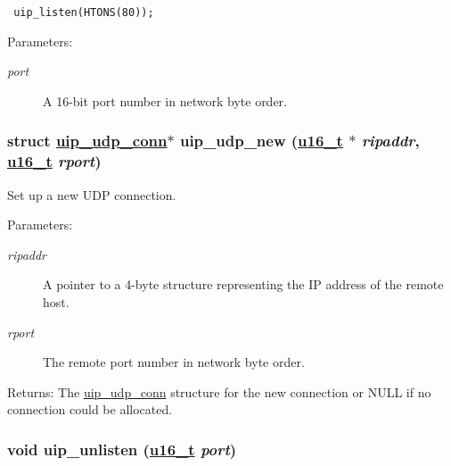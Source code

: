 \footnotesize\begin{verbatim} uip_listen(HTONS(80)); 
\end{verbatim}
\normalsize


\begin{Desc}
\item[Parameters:]
\begin{description}
\item[{\em port}]A 16-bit port number in network byte order. \end{description}
\end{Desc}
\hypertarget{a00059_g527ff0e535266167077b06d3a4742822}{
\subsubsection[uip\_\-udp\_\-new]{\setlength{\rightskip}{0pt plus 5cm}struct \hyperlink{a00032}{uip\_\-udp\_\-conn}$\ast$ uip\_\-udp\_\-new (\hyperlink{a00070_gfc6499c1f28697aa3bfc2804d496fd11}{u16\_\-t} $\ast$ {\em ripaddr}, \hyperlink{a00070_gfc6499c1f28697aa3bfc2804d496fd11}{u16\_\-t} {\em rport})}}
\label{a00059_g527ff0e535266167077b06d3a4742822}


Set up a new UDP connection. 

\begin{Desc}
\item[Parameters:]
\begin{description}
\item[{\em ripaddr}]A pointer to a 4-byte structure representing the IP address of the remote host.\item[{\em rport}]The remote port number in network byte order.\end{description}
\end{Desc}
\begin{Desc}
\item[Returns:]The \hyperlink{a00032}{uip\_\-udp\_\-conn} structure for the new connection or NULL if no connection could be allocated. \end{Desc}
\hypertarget{a00059_gaa585784b0914cac1d37f07f85457008}{
\subsubsection[uip\_\-unlisten]{\setlength{\rightskip}{0pt plus 5cm}void uip\_\-unlisten (\hyperlink{a00070_gfc6499c1f28697aa3bfc2804d496fd11}{u16\_\-t} {\em port})}}
\label{a00059_gaa585784b0914cac1d37f07f85457008}


